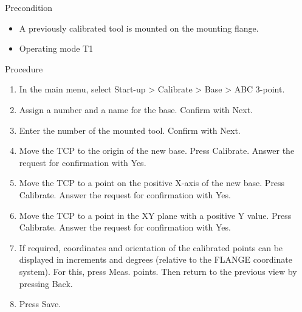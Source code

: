 		Precondition
		\begin{itemize}
			\item A previously calibrated tool is mounted on the mounting flange.
			\item Operating mode T1
		\end{itemize}
		
		Procedure
		\begin{enumerate}
			\item In the main menu, select Start-up > Calibrate > Base > ABC 3-point.
			\item Assign a number and a name for the base. Confirm with Next.
			\item Enter the number of the mounted tool. Confirm with Next.
			\item Move the TCP to the origin of the new base. Press Calibrate. Answer the request for confirmation with Yes.
			\item Move the TCP to a point on the positive X-axis of the new base. Press Calibrate. Answer the request for confirmation with Yes.
			\item Move the TCP to a point in the XY plane with a positive Y value. Press Calibrate. Answer the request for confirmation with Yes.
			\item If required, coordinates and orientation of the calibrated points can be displayed in increments and degrees (relative to the FLANGE coordinate system). For this, press Meas. points. Then return to the previous view by pressing Back.
			\item Press Save.
		\end{enumerate}
		
		\newpage

